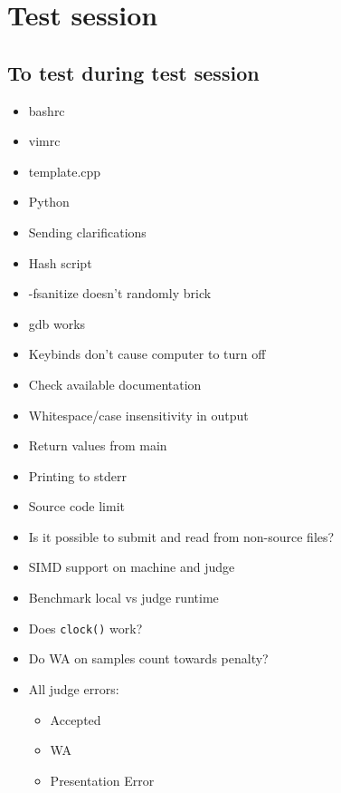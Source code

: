 \appendix
\chapter{Test session}

\section{To test during test session}
\begin{itemize}
	\item bashrc
	\item vimrc
	\item template.cpp
	\item Python
	\item Sending clarifications
	\item Hash script
	\item -fsanitize doesn't randomly brick
	\item gdb works
	\item Keybinds don't cause computer to turn off
	\item Check available documentation
	\item Whitespace/case insensitivity in output
	\item Return values from main
	\item Printing to stderr
	\item Source code limit
	\item Is it possible to submit and read from non-source files?
	\item SIMD support on machine and judge
	\item Benchmark local vs judge runtime
	\item Does \texttt{clock()} work?
	\item Do WA on samples count towards penalty?
	\item All judge errors:
		\begin{itemize}
			\item Accepted
			\item WA
			\item Presentation Error

\end{itemize}
\end{itemize}
